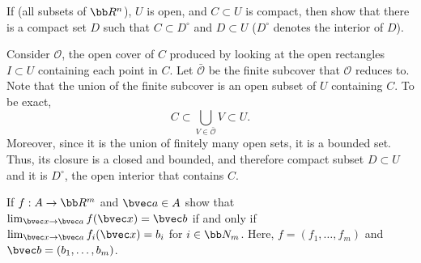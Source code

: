 \documentclass[12pt, letterpaper]{hmcpset}
\begin{document}
\pagebreak

\begin{problem}[22]
	If (all subsets of $\bb R^n$), $U$ is open, and $C \subset U$ is compact, then show that there is a compact set $D$ such that $C \subset D^\circ$ and $D \subset U$ ($D^\circ$ denotes the interior of $D$).
\end{problem}

\begin{solution}
	Consider $\mathcal O$, the open cover of $C$ produced by looking at the open rectangles $I \subset U$ containing each point in $C$. Let $\bar{\mathcal O}$ be the finite subcover that $\mathcal O$ reduces to. Note that the union of the finite subcover is an open subset of $U$ containing $C$. To be exact,
	\[
		C \subset \bigcup_{V \in \bar{\mathcal O}} V \subset U.
	\]
	Moreover, since it is the union of finitely many open sets, it is a bounded set. Thus, its closure is a closed and bounded, and therefore compact subset $D \subset U$ and it is $D^\circ$, the open interior that contains $C$.
\end{solution}

\pagebreak

\begin{problem}[23]
	If $f : A \to \bb R^m$ and $\bvec a \in A$ show that $\lim_{\bvec x \to \bvec a} f(\bvec x) = \bvec b$ if and only if $\lim_{\bvec x \to \bvec a} f_i(\bvec x) = b_i$ for $i \in \bb N_m$. Here, $f = (f_1, \ldots, f_m)$ and $\bvec b = (b_1, \ldots, b_m)$.
\end{problem}
\end{document}
